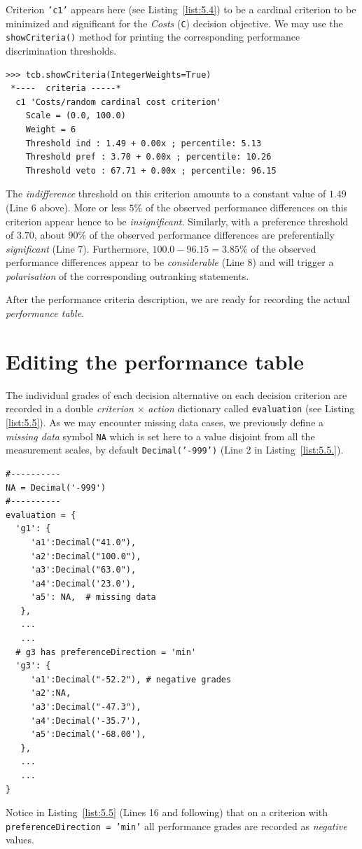 Criterion \texttt{'c1'} appears here (see Listing~\vref{list:5.4}) to be a cardinal criterion to be minimized and significant for the \emph{Costs} (\texttt{C}) decision objective. We may use the \texttt{showCriteria()} method for printing the corresponding performance discrimination thresholds.
\begin{lstlisting}
>>> tcb.showCriteria(IntegerWeights=True)
 *----  criteria -----*
  c1 'Costs/random cardinal cost criterion'
    Scale = (0.0, 100.0)
    Weight = 6 
    Threshold ind : 1.49 + 0.00x ; percentile: 5.13
    Threshold pref : 3.70 + 0.00x ; percentile: 10.26
    Threshold veto : 67.71 + 0.00x ; percentile: 96.15
\end{lstlisting}
The \emph{indifference} threshold on this criterion amounts to a constant value of $1.49$ (Line 6 above). More or less $5\%$ of the observed performance differences on this criterion appear hence to be \emph{insignificant}. Similarly, with a preference threshold of $3.70$, about $90\%$ of the observed performance differences are preferentially \emph{significant} (Line 7). Furthermore, $100.0 - 96.15 = 3.85\%$ of the observed performance differences appear to be \emph{considerable} (Line 8) and will trigger a \emph{polarisation} of the corresponding outranking statements.

After the performance criteria description, we are ready for recording the actual \emph{performance table}.

\section{Editing the performance table}
\label{sec:5.5}

The individual grades of each decision alternative on each decision criterion are recorded in a double \emph{criterion} $\times$ \emph{action} dictionary called \texttt{evaluation} (see Listing \ref{list:5.5}). As we may encounter missing data cases, we previously define a \emph{missing data} symbol \texttt{NA} which is set here to a value disjoint from all the measurement scales, by default \texttt{Decimal('-999')} (Line 2 in Listing~\vref{list:5.5.}).
\begin{lstlisting}[caption={Editing performance grades},label=list:5.5]
#----------
NA = Decimal('-999')
#----------
evaluation = {
  'g1': {
     'a1':Decimal("41.0"),
     'a2':Decimal("100.0"),
     'a3':Decimal("63.0"),
     'a4':Decimal('23.0'),
     'a5': NA,  # missing data
   },
   ...
   ...
  # g3 has preferenceDirection = 'min'
  'g3': {
     'a1':Decimal("-52.2"), # negative grades
     'a2':NA,
     'a3':Decimal("-47.3"),
     'a4':Decimal('-35.7'),
     'a5':Decimal('-68.00'),
   },
   ...
   ...
}
\end{lstlisting}
Notice in Listing~\vref{list:5.5} (Lines 16 and following) that on a criterion with \texttt{preferenceDirection = 'min'} all performance grades are recorded as \emph{negative} values.

